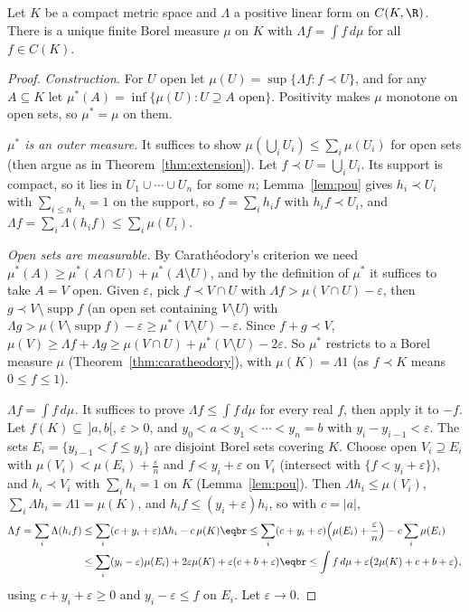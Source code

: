 \begin{theorem}\label{thm:riesz}
Let $K$ be a compact metric space and $\Lambda$ a positive linear form on $C(K,\R)$. There is a unique finite Borel measure $\mu$ on $K$ with $\Lambda f=\int f\,d\mu$ for all $f\in C(K)$.
\end{theorem}
\begin{proof}
\emph{Construction.} For $U$ open let $\mu(U)=\sup\{\Lambda f:f\prec U\}$, and for any $A\subseteq K$ let $\mu^*(A)=\inf\{\mu(U):U\supseteq A\text{ open}\}$. Positivity makes $\mu$ monotone on open sets, so $\mu^*=\mu$ on them.

\emph{$\mu^*$ is an outer measure.} It suffices to show $\mu(\bigcup_iU_i)\le\sum_i\mu(U_i)$ for open sets (then argue as in Theorem~\ref{thm:extension}). Let $f\prec U=\bigcup_iU_i$. Its support is compact, so it lies in
$U_1\cup\cdots\cup U_n$ for some $n$; Lemma~\ref{lem:pou} gives $h_i\prec U_i$ with $\sum_{i\le n}h_i=1$ on the support, so $f=\sum_ih_if$ with $h_if\prec U_i$, and $\Lambda f=\sum_i\Lambda(h_if)\le\sum_i\mu(U_i)$.

\emph{Open sets are measurable.} By Carath\'eodory's criterion we need $\mu^*(A)\ge\mu^*(A\cap U)+\mu^*(A\setminus U)$, and by the definition of $\mu^*$ it suffices to take $A=V$ open. Given $\varepsilon$, pick $f\prec V\cap U$ with
$\Lambda f>\mu(V\cap U)-\varepsilon$, then $g\prec V\setminus\operatorname{supp}f$ (an open set containing $V\setminus U$) with $\Lambda g>\mu(V\setminus\operatorname{supp}f)-\varepsilon\ge\mu^*(V\setminus U)-\varepsilon$. Since $f+g\prec V$,
$\mu(V)\ge\Lambda f+\Lambda g\ge\mu(V\cap U)+\mu^*(V\setminus U)-2\varepsilon$. So $\mu^*$ restricts to a Borel measure $\mu$ (Theorem~\ref{thm:caratheodory}), with $\mu(K)=\Lambda1$ (as $f\prec K$ means $0\le f\le1$).

\emph{$\Lambda f=\int f\,d\mu$.} It suffices to prove $\Lambda f\le\int f\,d\mu$ for every real $f$, then apply it to $-f$. Let $f(K)\subseteq\,]a,b[$, $\varepsilon>0$, and $y_0<a<y_1<\cdots<y_n=b$ with $y_i-y_{i-1}<\varepsilon$. The sets
$E_i=\{y_{i-1}<f\le y_i\}$ are disjoint Borel sets covering $K$. Choose open $V_i\supseteq E_i$ with $\mu(V_i)<\mu(E_i)+\frac\varepsilon n$ and $f<y_i+\varepsilon$ on $V_i$ (intersect with $\{f<y_i+\varepsilon\}$), and $h_i\prec V_i$ with $\sum_ih_i=1$
on $K$ (Lemma~\ref{lem:pou}). Then $\Lambda h_i\le\mu(V_i)$, $\sum_i\Lambda h_i=\Lambda1=\mu(K)$, and $h_if\le(y_i+\varepsilon)h_i$, so with $c=|a|$,
\[\begin{aligned}\Lambda f=\sum_i\Lambda(h_if)&\le\sum_i(c+y_i+\varepsilon)\Lambda h_i-c\,\mu(K)\eqbr\le\sum_i(c+y_i+\varepsilon)\Bigl(\mu(E_i)+\frac\varepsilon n\Bigr)-c\sum_i\mu(E_i)\\&\le\sum_i(y_i-\varepsilon)\mu(E_i)+2\varepsilon\mu(K)+\varepsilon(c+b+\varepsilon)\eqbr\le\int f\,d\mu+\varepsilon\bigl(2\mu(K)+c+b+\varepsilon\bigr),\end{aligned}\]
using $c+y_i+\varepsilon\ge0$ and $y_i-\varepsilon\le f$ on $E_i$. Let $\varepsilon\to0$.


\end{proof}
